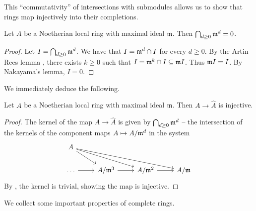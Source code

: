 This ``commutativity'' of intersections with submodules allows us to show that rings map injectively into their completions. 
\begin{theorem}\label{thm: Krull intersection}
    Let $A$ be a Noetherian local ring with maximal ideal $\mathfrak{m}$. Then $\bigcap_{d\geq0}\mathfrak{m}^{d}=0$. 
\end{theorem}
\begin{proof}
    Let $I=\bigcap_{d\geq0}\mathfrak{m}^{d}$. We have that $I=\mathfrak{m}^{d}\cap I$ for every $d\geq0$. By the Artin-Rees lemma , there exists $k\geq0$ such that $I=\mathfrak{m}^{k}\cap I\subseteq\mathfrak{m} I$. Thus $\mathfrak{m} I=I$. By Nakayama's lemma, $I=0$. 
\end{proof}
We immediately deduce the following. 
\begin{corollary}\label{corr: injective map into completion}
    Let $A$ be a Noetherian local ring with maximal ideal $\mathfrak{m}$. Then $A\to\widehat{A}$ is injective. 
\end{corollary}
\begin{proof}
    The kernel of the map $A\to\widehat{A}$ is given by $\bigcap_{d\geq0}\mathfrak{m}^{d}$ -- the intersection of the kernels of the component maps $A\mapsto A/\mathfrak{m}^{d}$ in the system 
    $$%
    \begin{tikzcd}
        A \\
        \dots & {A/\mfrak^{3}} & {A/\mfrak^{2}} & {A/\mfrak}
        \arrow[from=1-1, to=2-2]
        \arrow[from=1-1, to=2-3]
        \arrow[from=1-1, to=2-4]
        \arrow[from=2-1, to=2-2]
        \arrow[from=2-2, to=2-3]
        \arrow[from=2-3, to=2-4]
    \end{tikzcd}$$
    By , the kernel is trivial, showing the map is injective. 
\end{proof}
We collect some important properties of complete rings. 
